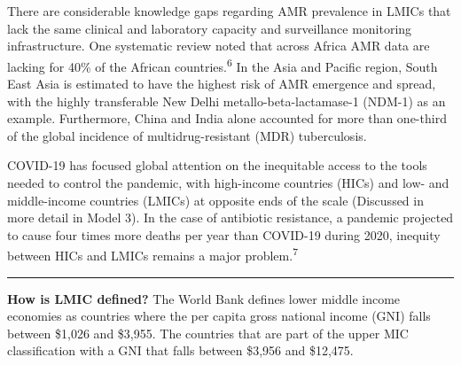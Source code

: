 \documentclass[
  11pt,
  paper=a4,
  ,captions=tableheading
]{scrartcl}
\begin{document}
There are considerable knowledge gaps regarding AMR prevalence in LMICs
that lack the same clinical and laboratory capacity and surveillance
monitoring infrastructure. One systematic review noted that across
Africa AMR data are lacking for 40\% of the African
countries.\textsuperscript{6} In the Asia and Pacific region, South East
Asia is estimated to have the highest risk of AMR emergence and spread,
with the highly transferable New Delhi metallo-beta-lactamase-1 (NDM-1)
as an example. Furthermore, China and India alone accounted for more
than one-third of the global incidence of multidrug-resistant (MDR)
tuberculosis.

COVID-19 has focused global attention on the inequitable access to the
tools needed to control the pandemic, with high-income countries (HICs)
and low- and middle-income countries (LMICs) at opposite ends of the
scale (Discussed in more detail in Model 3). In the case of antibiotic
resistance, a pandemic projected to cause four times more deaths per
year than COVID-19 during 2020, inequity between HICs and LMICs remains
a major problem.\textsuperscript{7}

\newpage

\begin{center}\rule{0.5\linewidth}{0.5pt}\end{center}

\textbf{How is LMIC defined?} The World Bank defines lower middle income
economies as countries where the per capita gross national income (GNI)
falls between \$1,026 and \$3,955. The countries that are part of the
upper MIC classification with a GNI that falls between \$3,956 and
\$12,475.
\end{document}

